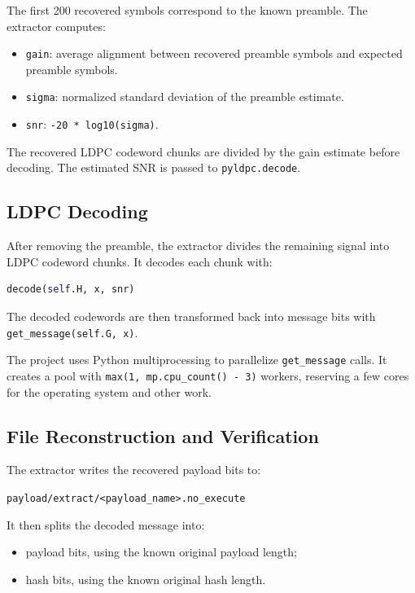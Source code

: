 \documentclass[11pt,a4paper]{article}
\newcommand{\code}[1]{\texttt{#1}}
\begin{document}
The first 200 recovered symbols correspond to the known preamble. The extractor computes:

\begin{itemize}[leftmargin=1.4em]
  \item \code{gain}: average alignment between recovered preamble symbols and expected preamble symbols.
  \item \code{sigma}: normalized standard deviation of the preamble estimate.
  \item \code{snr}: \code{-20 * log10(sigma)}.
\end{itemize}

The recovered LDPC codeword chunks are divided by the gain estimate before decoding. The estimated SNR is passed to \code{pyldpc.decode}.

\subsection{LDPC Decoding}

After removing the preamble, the extractor divides the remaining signal into LDPC codeword chunks. It decodes each chunk with:

\begin{lstlisting}[language=Python]
decode(self.H, x, snr)
\end{lstlisting}

The decoded codewords are then transformed back into message bits with \code{get\_message(self.G, x)}.

The project uses Python multiprocessing to parallelize \code{get\_message} calls. It creates a pool with \code{max(1, mp.cpu\_count() - 3)} workers, reserving a few cores for the operating system and other work.

\subsection{File Reconstruction and Verification}

The extractor writes the recovered payload bits to:

\begin{center}
\code{payload/extract/<payload\_name>.no\_execute}
\end{center}

It then splits the decoded message into:

\begin{itemize}[leftmargin=1.4em]
  \item payload bits, using the known original payload length;
  \item hash bits, using the known original hash length.
\end{itemize}
\end{document}
